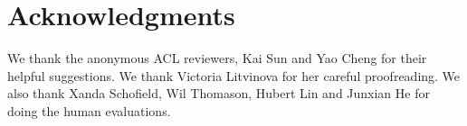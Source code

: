 \documentclass[11pt,a4paper]{article}
\begin{document}
 

 

 
 
 
\section*{Acknowledgments}

We thank the anonymous ACL reviewers, Kai Sun and Yao Cheng for their helpful suggestions. We thank Victoria Litvinova for her careful proofreading. We also thank Xanda Schofield, Wil Thomason, Hubert Lin and Junxian He for doing the human evaluations.

%
%






\end{document}
